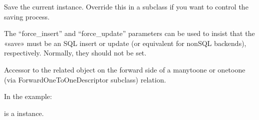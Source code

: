\documentclass[letterpaper,10pt,spanish]{sphinxmanual}
\begin{document}
\begin{fulllineitems}
\begin{fulllineitems}
\end{fulllineitems}



\begin{fulllineitems}

\pysigstartsignatures
{}
\pysigstopsignatures
\sphinxAtStartPar
Save the current instance. Override this in a subclass if you want to
control the saving process.

\sphinxAtStartPar
The “force\_insert” and “force\_update” parameters can be used to insist
that the «save» must be an SQL insert or update (or equivalent for
non\sphinxhyphen{}SQL backends), respectively. Normally, they should not be set.

\end{fulllineitems}



\begin{fulllineitems}

\pysigstartsignatures
{}
\pysigstopsignatures
\sphinxAtStartPar
Accessor to the related object on the forward side of a many\sphinxhyphen{}to\sphinxhyphen{}one or
one\sphinxhyphen{}to\sphinxhyphen{}one (via ForwardOneToOneDescriptor subclass) relation.

\sphinxAtStartPar
In the example:

\begin{sphinxVerbatim}[commandchars=\\\{\}]
 
       
\end{sphinxVerbatim}

\sphinxAtStartPar
{} is a  instance.

\end{fulllineitems}



\begin{fulllineitems}

\pysigstartsignatures
{}
\pysigstopsignatures
\end{fulllineitems}




\end{fulllineitems}
\end{document}
